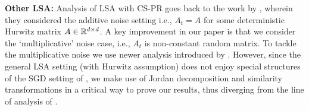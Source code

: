 \textbf{Other LSA:} Analysis of LSA with CS-PR goes back to the work by \citet{polyak-judisky}, wherein they considered the additive noise setting i.e., $A_t=A$ for some deterministic Hurwitz matrix $A\in \mathbb{R}^{d \times d}$. A key improvement in our paper is that we consider the `multiplicative' noise case, i.e., $A_t$ is non-constant random matrix. To tackle the multiplicative noise we use newer analysis introduced by \citet{bach}. However, since the general LSA setting (with Hurwitz assumption) does not enjoy special structures of the SGD setting of \citet{bach}, we make use of Jordan decomposition and similarity transformations in a critical way to prove our results, thus diverging from the line of analysis of 
\citet{bach}. 

\begin{comment}
\paragraph{Double Sampling} We suspect that GTD-Mirror-Prox algorithm suffers from the issue of double sampling. The updates of the GTDMP can be written as below (for simplicity we 
\begin{align}\label{eq:gtdmp}
\begin{split}
y_t^m=y_t+\alpha_t(b_t-A_t\theta_t- M_t y_t), \theta_t^m=\theta_t+\alpha_t A_t^\top y_t,\\
y_{t+1}=y_t+\alpha_t(b_t-A_t\theta_t^m- M_t y_t), \theta_{t+1}=\theta_t+\alpha_t A_t^\top y_t^m,\end{split}
\end{align}
where $A_t=\rho_t\phi_t(\phi_t-\gamma\phi'_t)^\top$ and $b_t=r_t\phi_t$. Expanding $\theta_{t+1}=\theta_t+\alpha_tA_t^\top\left(y_t+ \alpha_t (b_t-A_t\theta_t- M_t y_t) \right)$, we observe the occurrence of the $A^\top_tA_t$ and we suspect that for this term to be unbiased we need the $A_t$s appearing in the $(\cdot)^m_t$ update and $(\cdot)_{t+1}$ to be independent (a similar issue arises with the term $A_tA^\top_t$ in $y_{t+1}$), which means we might require twice as many samples to perform unbiased updates for GTD-MP.

 Letting $x_t=(y_t,\theta_t)$, $H_t=\begin{matrix}M_t &A_t\\ -A_t^\top &\mathbf{0}_{\dcd}\end{matrix}$, and $g_t=\begin{matrix}b_t\\ 0\end{matrix}$ we re-write \eqref{eq:gtdmp} as
\begin{align}\label{eq:gtdmpshort}
x_t^m&=x_t+\alpha_t( g_t-H_t x_t), \\
x_{t+1}&=x_t+\alpha_t( g_t-H_t x_t^m),
&=x_t+\alpha_t\left( (g_t-\alpha_t H_t  g_t) -(H_t -\alpha_t H_t^2 ) x_t\right),
\end{align}
The stationary linear system corresponding to \eqref{eq:gtdmpshort} is $\E[H_t] x=\E[g_t]-\E[H_t g_t]$


\end{comment}
